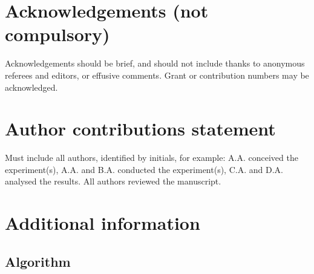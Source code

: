 \documentclass[fleqn,10pt]{wlscirep}
\begin{document}
\section*{Acknowledgements (not compulsory)}

Acknowledgements should be brief, and should not include thanks to anonymous referees and editors, or effusive comments. Grant or contribution numbers may be acknowledged.

\section*{Author contributions statement}

Must include all authors, identified by initials, for example:
A.A. conceived the experiment(s),  A.A. and B.A. conducted the experiment(s), C.A. and D.A. analysed the results.  All authors reviewed the manuscript. 

\section*{Additional information}

\subsection*{Algorithm}
\label{algorithms}
\end{document}
